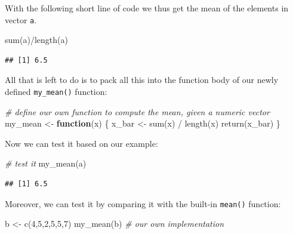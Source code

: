 \documentclass[
  12pt,
]{style/krantz}
\newenvironment{Shaded}{\begin{snugshade}}{\end{snugshade}}
\newcommand{\CommentTok}[1]{\textcolor[rgb]{0.56,0.35,0.01}{\textit{#1}}}
\newcommand{\ControlFlowTok}[1]{\textcolor[rgb]{0.13,0.29,0.53}{\textbf{#1}}}
\newcommand{\DecValTok}[1]{\textcolor[rgb]{0.00,0.00,0.81}{#1}}
\newcommand{\FunctionTok}[1]{\textcolor[rgb]{0.00,0.00,0.00}{#1}}
\newcommand{\NormalTok}[1]{#1}
\newcommand{\OtherTok}[1]{\textcolor[rgb]{0.56,0.35,0.01}{#1}}
\newcommand{\SpecialCharTok}[1]{\textcolor[rgb]{0.00,0.00,0.00}{#1}}
\begin{document}
With the following short line of code we thus get the mean of the elements in vector \texttt{a}.

\begin{Shaded}
\begin{Highlighting}[]
\FunctionTok{sum}\NormalTok{(a)}\SpecialCharTok{/}\FunctionTok{length}\NormalTok{(a)}
\end{Highlighting}
\end{Shaded}

\begin{verbatim}
## [1] 6.5
\end{verbatim}

All that is left to do is to pack all this into the function body of our newly defined \texttt{my\_mean()} function:

\begin{Shaded}
\begin{Highlighting}[]
\CommentTok{\# define our own function to compute the mean, given a numeric vector}
\NormalTok{my\_mean }\OtherTok{\textless{}{-}} \ControlFlowTok{function}\NormalTok{(x) \{}
\NormalTok{     x\_bar }\OtherTok{\textless{}{-}} \FunctionTok{sum}\NormalTok{(x) }\SpecialCharTok{/} \FunctionTok{length}\NormalTok{(x)}
     \FunctionTok{return}\NormalTok{(x\_bar)}
\NormalTok{\}}
\end{Highlighting}
\end{Shaded}

Now we can test it based on our example:

\begin{Shaded}
\begin{Highlighting}[]
\CommentTok{\# test it}
\FunctionTok{my\_mean}\NormalTok{(a)}
\end{Highlighting}
\end{Shaded}

\begin{verbatim}
## [1] 6.5
\end{verbatim}

Moreover, we can test it by comparing it with the built-in \texttt{mean()} function:

\begin{Shaded}
\begin{Highlighting}[]
\NormalTok{b }\OtherTok{\textless{}{-}} \FunctionTok{c}\NormalTok{(}\DecValTok{4}\NormalTok{,}\DecValTok{5}\NormalTok{,}\DecValTok{2}\NormalTok{,}\DecValTok{5}\NormalTok{,}\DecValTok{5}\NormalTok{,}\DecValTok{7}\NormalTok{)}
\FunctionTok{my\_mean}\NormalTok{(b) }\CommentTok{\# our own implementation}
\end{Highlighting}
\end{Shaded}
\end{document}
